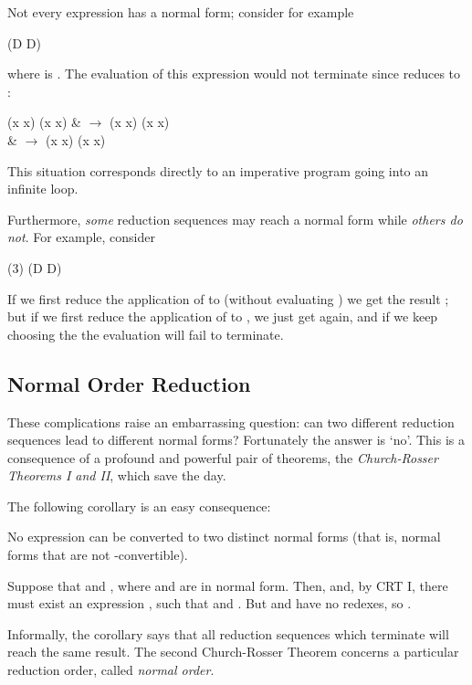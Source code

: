Not every expression has a normal form; consider for example
\begin{mlcoded}
    (D D)
\end{mlcoded}
where  is . The evaluation of this expression would not terminate since  reduces to :
\begin{mlalign}
    (x x) (x x) & $\rightarrow$ (x x) (x x)\\
    & $\rightarrow$ (x x) (x x)
\end{mlalign}
This situation corresponds directly to an imperative program going into an infinite loop.

Furthermore, \textit{some} reduction sequences may reach a normal form while \textit{others do not}. For example, consider
\begin{mlcoded}
    (3) (D D)
\end{mlcoded}
If we first reduce the application of  to  (without evaluating ) we get the result ; but if we first reduce the application of  to , we just get  again, and if we keep choosing the  the evaluation will fail to terminate.

\subsection{Normal Order Reduction}

These complications raise an embarrassing question: can two different reduction sequences lead to different normal forms? Fortunately the answer is `no'. This is a consequence of a profound and powerful pair of theorems, the \textit{Church-Rosser Theorems I and II}, which save the day.


\noindent The following corollary is an easy consequence:
\begin{pcorollary}
No expression can be converted to two distinct normal forms (that is, normal forms that are not \ta{}-convertible).
\end{pcorollary}
\vspace{-23pt}
\begin{pproof}
Suppose that  and , where  and  are in normal form. Then,  and, by CRT I, there must exist an expression , such that  and . But  and  have no redexes, so .
\end{pproof}
\noindent Informally, the corollary says that all reduction sequences which terminate will reach the same result. The second Church-Rosser Theorem concerns a particular reduction order, called \textit{normal order}.

